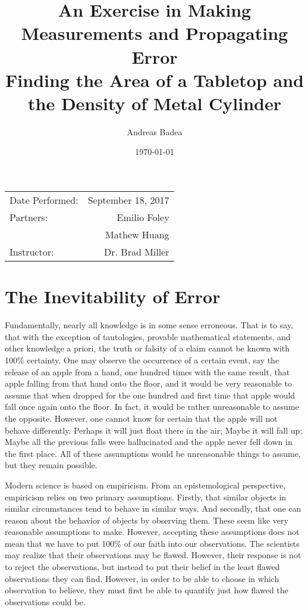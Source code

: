 \documentclass[11pt]{article}
\title{An Exercise in Making Measurements and Propagating Error
\\ \large Finding the Area of a Tabletop and the Density of Metal Cylinder}
\author{Andreas Badea}
\date{\today}
\begin{document}
\maketitle 
\begin{center}
	\begin{tabular}{l r}
		Date Performed: & September 18, 2017 \\ %
		Partners: & Emilio Foley \\ %
		& Mathew Huang \\
		Instructor: & Dr. Brad Miller %
	\end{tabular}
\end{center}

\section{The Inevitability of Error}
Fundamentally, nearly all knowledge is in some sense erroneous. That is to say, that with the exception of tautologies, provable mathematical statements, and other knowledge a priori, the truth or falsity of a claim cannot be known with 100\% certainty. One may observe the occurrence of a certain event, say the release of an apple from a hand, one hundred times with the same result, that apple falling from that hand onto the floor, and it would be very reasonable to assume that when dropped for the one hundred and first time that apple would fall once again onto the floor. In fact, it would be rather unreasonable to assume the opposite. However, one cannot know for certain that the apple will not behave differently. Perhaps it will just float there in the air; Maybe it will fall up; Maybe all the previous falls were hallucinated and the apple never fell down in the first place. All of these assumptions would be unreasonable things to assume, but they remain possible. 

Modern science is based on empiricism. From an epistemological perspective, empiricism relies on two primary assumptions. Firstly, that similar objects in similar circumstances tend to behave in similar ways. And secondly, that one can reason about the behavior of objects by observing them. These seem like very reasonable assumptions to make. However, accepting these assumptions does not mean that we have to put 100\% of our faith into our observations. The scientists may realize that their observations may be flawed. However, their response is not to reject the observations, but instead to put their belief in the least flawed observations they can find. However, in order to be able to choose in which observation to believe, they must first be able to quantify just how flawed the observations could be.
\end{document}
